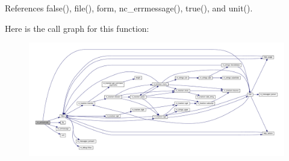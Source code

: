 References false(), file(), form, nc\+\_\+errmessage(), true(), and unit().

Here is the call graph for this function\+:
\nopagebreak
\begin{figure}[H]
\begin{center}
\leavevmode
\includegraphics[width=350pt]{nc__printunicode_8f90_ab56a30537897cb7b2a3e7e4c44767b05_cgraph}
\end{center}
\end{figure}
